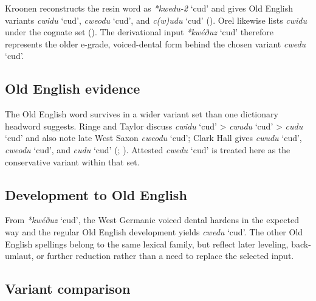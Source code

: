 \documentclass[
  british,
  a4paper,
  openany]{book}
\providecommand{\Recon}[1]{\emph{*#1}}
{\catcode`→=\active \global\def→{\ensuremath{\rightarrow}}}
\providecommand{\Recon}[1]{\emph{*#1}}
{\catcode`→=\active \global\def→{\ensuremath{\rightarrow}}}
\begin{document}
Kroonen reconstructs the resin word as \Recon{kwedu-2} `cud' and gives
Old English variants {\emph{cwidu}} `cud', {\emph{cweodu}} `cud', and
{\emph{c(w)udu}} `cud' ().
Orel likewise lists {\emph{cwidu}} under the cognate set
(). The derivational input
{\Recon{kwéðuz} `cud'} therefore represents the older e-grade,
voiced-dental form behind the chosen variant {\emph{cwedu}} `cud'.

\subsection{Old English evidence}\label{old-english-evidence-70}

The Old English word survives in a wider variant set than one dictionary
headword suggests. Ringe and Taylor discuss {\emph{cwidu}} `cud'
\textgreater{} {\emph{cwudu}} `cud' \textgreater{} {\emph{cudu}} `cud'
and also note late West Saxon {\emph{cweodu}} `cud'; Clark Hall gives
{\emph{cwudu}} `cud', {\emph{cweodu}} `cud', and {\emph{cudu}} `cud'
(;
). Attested
\emph{cwedu} `cud' is treated here as the conservative variant within
that set.

\subsection{Development to Old
English}\label{development-to-old-english-70}

From {\Recon{kwéðuz} `cud'}, the West Germanic voiced dental hardens in
the expected way and the regular Old English development yields
{\emph{cwedu}} `cud'. The other Old English spellings belong to the same
lexical family, but reflect later leveling, back-umlaut, or further
reduction rather than a need to replace the selected input.

\subsection{Variant comparison}\label{variant-comparison}
\end{document}

